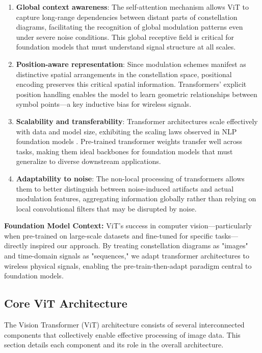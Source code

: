 \begin{enumerate}
    \item \textbf{Global context awareness}: The self-attention mechanism allows ViT to capture long-range dependencies between distant parts of constellation diagrams, facilitating the recognition of global modulation patterns even under severe noise conditions. This global receptive field is critical for foundation models that must understand signal structure at all scales.
    
    \item \textbf{Position-aware representation}: Since modulation schemes manifest as distinctive spatial arrangements in the constellation space, positional encoding preserves this critical spatial information. Transformers' explicit position handling enables the model to learn geometric relationships between symbol points—a key inductive bias for wireless signals.
    
    \item \textbf{Scalability and transferability}: Transformer architectures scale effectively with data and model size, exhibiting the scaling laws observed in NLP foundation models \cite{kaplan2020scaling}. Pre-trained transformer weights transfer well across tasks, making them ideal backbones for foundation models that must generalize to diverse downstream applications.
    
    \item \textbf{Adaptability to noise}: The non-local processing of transformers allows them to better distinguish between noise-induced artifacts and actual modulation features, aggregating information globally rather than relying on local convolutional filters that may be disrupted by noise.
\end{enumerate}

\textbf{Foundation Model Context:} ViT's success in computer vision—particularly when pre-trained on large-scale datasets and fine-tuned for specific tasks—directly inspired our approach. By treating constellation diagrams as "images" and time-domain signals as "sequences," we adapt transformer architectures to wireless physical signals, enabling the pre-train-then-adapt paradigm central to foundation models.

\subsection{Core ViT Architecture}

The Vision Transformer (ViT) architecture consists of several interconnected components that collectively enable effective processing of image data. This section details each component and its role in the overall architecture.

